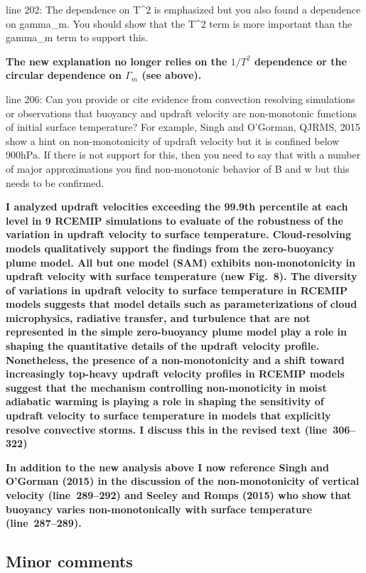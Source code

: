 \documentclass{article}
\begin{document}
\par
line 202: The dependence on T\^{}2 is emphasized but you also found a dependence on gamma\_m. You should show that the T\^{}2 term is more important than the gamma\_m term to support this.
\par
\textbf{The new explanation no longer relies on the $1/T^2$ dependence or the circular dependence on $\Gamma_m$ (see above).}
\par
line 206: Can you provide or cite evidence from convection resolving simulations or observations that buoyancy and updraft velocity are non-monotonic functions of initial surface temperature? For example, Singh and O'Gorman, QJRMS, 2015 show a hint on non-monotonicity of updraft velocity but it is confined below 900hPa. If there is not support for this, then you need to say that with a number of major approximations you find non-monotonic behavior of B and w but this needs to be confirmed.
\par
\textbf{I analyzed updraft velocities exceeding the 99.9th percentile at each level in 9 RCEMIP simulations to evaluate of the robustness of the variation in updraft velocity to surface temperature. Cloud-resolving models qualitatively support the findings from the zero-buoyancy plume model. All but one model (SAM) exhibits non-monotonicity in updraft velocity with surface temperature (new Fig.~8). The diversity of variations in updraft velocity to surface temperature in RCEMIP models suggests that model details such as parameterizations of cloud microphysics, radiative transfer, and turbulence that are not represented in the simple zero-buoyancy plume model play a role in shaping the quantitative details of the updraft velocity profile. Nonetheless, the presence of a non-monotonicity and a shift toward increasingly top-heavy updraft velocity profiles in RCEMIP models suggest that the mechanism controlling non-monoticity in moist adiabatic warming is playing a role in shaping the sensitivity of updraft velocity to surface temperature in models that explicitly resolve convective storms. I discuss this in the revised text (line~306--322)}
\par
\textbf{In addition to the new analysis above I now reference Singh and O'Gorman (2015) in the discussion of the non-monotonicity of vertical velocity (line~289--292) and Seeley and Romps (2015) who show that buoyancy varies non-monotonically with surface temperature (line~287--289).}

\subsection{Minor comments}
\end{document}

